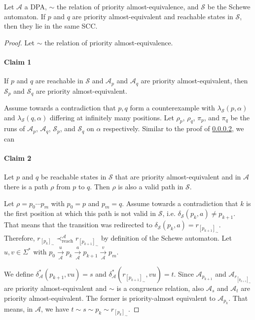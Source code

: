 \begin{lem}
	Let $\mathcal{A}$ a DPA, $\sim$ the relation of priority almost-equivalence, and $\mathcal{S}$ be the Schewe automaton. If $p$ and $q$ are priority almost-equivalent and reachable states in $\mathcal{S}$, then they lie in the same SCC.
\end{lem}

\begin{proof} 
	Let $\sim$ the relation of priority almost-equivalence.
	
	\paragraph{Claim 1} If $p$ and $q$ are reachable in $\mathcal{S}$ and $\mathcal{A}_p$ and $\mathcal{A}_q$ are priority almost-equivalent, then $\mathcal{S}_p$ and $\mathcal{S}_q$ are priority almost-equivalent.
	
	Assume towards a contradiction that $p, q$ form a counterexample with $\lambda_\mathcal{S}(p, \alpha)$ and $\lambda_\mathcal{S}(q, \alpha)$ differing at infinitely many positions. Let $\rho_p$, $\rho_q$, $\pi_p$, and $\pi_q$ be the runs of $\mathcal{A}_p$, $\mathcal{A}_q$, $\mathcal{S}_p$, and $\mathcal{S}_q$ on $\alpha$ respectively.	Similar to the proof of \ref{}, we can  %
	
	\paragraph{Claim 2} Let $p$ and $q$ be reachable states in $\mathcal{S}$ that are priority almost-equivalent and in $\mathcal{A}$ there is a path $\rho$ from $p$ to $q$. Then $\rho$ is also a valid path in $\mathcal{S}$.
	
	Let $\rho = p_0 \cdots p_m$ with $p_0 = p$ and $p_m = q$. Assume towards a contradiction that $k$ is the first position at which this path is not valid in $\mathcal{S}$, i.e. $\delta_\mathcal{S}(p_k, a) \neq p_{k+1}$. That means that the transition was redirected to $\delta_\mathcal{S}(p_k, a) = r_{[p_{k+1}]_\sim}$. Therefore, $r_{[p_k]_\sim} \prec_\text{reach}^\mathcal{A} r_{[p_{k+1}]_\sim}$ by definition of the Schewe automaton. Let $u, v \in \Sigma^*$ with $p_0 \overset{u}{\underset{\mathcal{A}}{\rightarrow}} p_k \overset{a}{\underset{\mathcal{A}}{\rightarrow}} p_{k+1} \overset{v}{\underset{\mathcal{A}}{\rightarrow}} p_m$.
	
	We define $\delta^*_\mathcal{A}(p_{k+1}, vu) = s$ and $\delta^*_\mathcal{A}(r_{[p_{k+1}]_\sim}, vu) = t$. Since $\mathcal{A}_{p_{k+1}}$ and $\mathcal{A}_{r_{[p_{k+1}]_\sim}}$ are priority almost-equivalent and $\sim$ is a congruence relation, also $\mathcal{A}_s$ and $\mathcal{A}_t$ are priority almost-equivalent. The former is priority-almost equivalent to $\mathcal{A}_{p_k}$. That means, in $\mathcal{A}$, we have $t \sim s \sim p_k \sim r_{[p_k]_\sim}$.
	

\end{proof}
